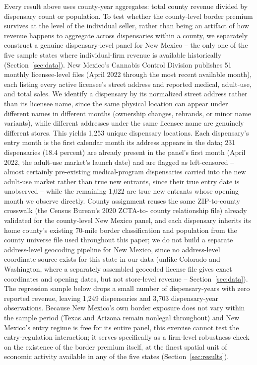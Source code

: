 \documentclass[12pt]{article}
\begin{document}
Every result above uses county-year aggregates: total county revenue divided by dispensary count or
population. To test whether the county-level border premium survives at the level of the individual seller,
rather than being an artifact of how revenue happens to aggregate across dispensaries within a county, we
separately construct a genuine dispensary-level panel for New Mexico -- the only one of the five sample states
where individual-firm revenue is available historically (Section~\ref{sec:data}). New Mexico's Cannabis Control
Division publishes 51 monthly licensee-level files (April 2022 through the most recent available month), each
listing every active licensee's street address and reported medical, adult-use, and total sales. We identify a
dispensary by its normalized street address rather than its licensee name, since the same physical location can
appear under different names in different months (ownership changes, rebrands, or minor name variants), while
different addresses under the same licensee name are genuinely different stores. This yields 1{,}253 unique
dispensary locations. Each dispensary's entry month is the first calendar month its address appears in the
data; 231 dispensaries (18.4 percent) are already present in the panel's first month (April 2022, the
adult-use market's launch date) and are flagged as left-censored -- almost certainly pre-existing
medical-program dispensaries carried into the new adult-use market rather than true new entrants, since their
true entry date is unobserved -- while the remaining 1{,}022 are true new entrants whose opening month we
observe directly. County assignment reuses the same ZIP-to-county crosswalk (the Census Bureau's 2020 ZCTA-to-
county relationship file) already validated for the county-level New Mexico panel, and each dispensary inherits
its home county's existing 70-mile border classification and population from the county universe file used
throughout this paper; we do not build a separate address-level geocoding pipeline for New Mexico, since no
address-level coordinate source exists for this state in our data (unlike Colorado and Washington, where a
separately assembled geocoded license file gives exact coordinates and opening dates, but not store-level
revenue -- Section~\ref{sec:data}). The regression sample below drops a small number of dispensary-years with
zero reported revenue, leaving 1{,}249 dispensaries and 3{,}703 dispensary-year observations. Because New
Mexico's own border exposure does not vary within the sample period (Texas and Arizona remain nonlegal
throughout) and New Mexico's entry regime is free for its entire panel, this exercise cannot test the
entry-regulation interaction; it serves specifically as a firm-level robustness check on the existence of the
border premium itself, at the finest spatial unit of economic activity available in any of the five states
(Section~\ref{sec:results}).
\end{document}
